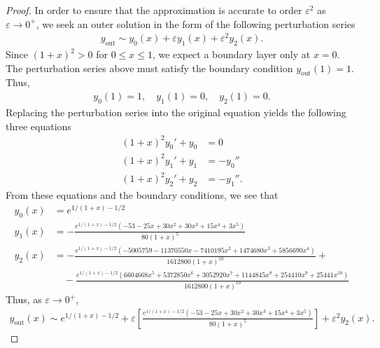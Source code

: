 \documentclass[12pt]{article}
\theoremstyle{definition}
\begin{document}
\begin{proof}
  In order to ensure that the approximation is accurate to order $\varepsilon^2$ as $\varepsilon \to 0^+$,
  we seek an outer solution in the form of the following perturbation series
  \begin{align*}
    y_{\text{out}} \sim y_0(x) + \varepsilon y_1(x) + \varepsilon^2 y_2(x).
  \end{align*}
  Since $(1+x)^2>0$ for $0\leq x\leq 1$, we expect a boundary layer only at $x=0$.
  The perturbation series above must satisfy the boundary condition $y_{\text{out}}(1) = 1$.
  Thus,
  \begin{align*}
    y_0(1) = 1, \quad y_1(1) = 0, \quad y_2(1) = 0.
  \end{align*}
  Replacing the perturbation series into the original equation yields the following three equations
  \begin{align*}
    (1+x)^2 y_0' + y_0 &= 0 \\
    (1+x)^2 y_1' + y_1 &= -y_0''\\
    (1+x)^2 y_2' + y_2 &= -y_1''.
  \end{align*}
  From these equations and the boundary conditions, we see that
  \begin{align*}
    y_0(x) &= e^{1/(1+x) - 1/2} \\
    y_1(x) &= -\frac{e^{1/(1+x) - 1/2}\left(-53 - 25 x + 30 x^2 + 30 x^3 + 15 x^4 + 3 x^5\right)}{80 (1 + x)^5}\\
    y_2(x) &= -\frac{e^{1/(1+x) - 1/2}\left(-5005759 - 11370550 x - 7410195 x^2 + 1474680 x^3 + 5856690 x^4\right)}{1612800 (1 + x)^{10}} +\\
    &\quad - \frac{e^{1/(1+x) - 1/2}\left( 6604668 x^5 + 5372850 x^6 + 3052920 x^7 + 1144845 x^8 + 254410 x^9 + 25441 x^{10}\right)}{1612800 (1 + x)^{10}}
  \end{align*}
  Thus, as $\varepsilon \to 0^+$,
  \begin{align*}
    y_{\text{out}}(x) \sim e^{1/(1+x) - 1/2} + \varepsilon \left[\frac{e^{1/(1+x) - 1/2}\left(-53 - 25 x + 30 x^2 + 30 x^3 + 15 x^4 + 3 x^5\right)}{80 (1 + x)^5}\right] + \varepsilon^2 y_2(x).
  \end{align*}


\end{proof}
\end{document}
